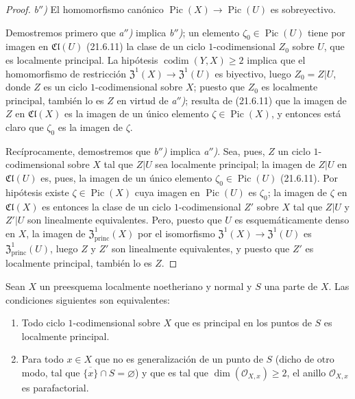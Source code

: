 \begin{proof}
\emph{b$''$)} El homomorfismo canónico
$\operatorname{Pic}(X)\to\operatorname{Pic}(U)$ es sobreyectivo.

Demostremos primero que \emph{a$''$)} implica \emph{b$''$)}; un elemento
$\zeta_0\in\operatorname{Pic}(U)$ tiene por imagen en $\mathfrak{Cl}(U)$ (21.6.11) la
clase de un ciclo $1$-codimensional $Z_0$ sobre $U$, que es localmente principal.
La hipótesis $\operatorname{codim}(Y,X)\geq2$ implica que el homomorfismo de
restricción $\mathfrak{Z}^1(X)\to\mathfrak{Z}^1(U)$ es biyectivo, luego $Z_0=Z|U$, donde $Z$
es un ciclo $1$-codimensional sobre $X$; puesto que $Z_0$ es localmente principal, también lo
es $Z$ en virtud de \emph{a$''$)}; resulta de (21.6.11) que la imagen de $Z$ en
$\mathfrak{Cl}(X)$ es la imagen de un único elemento $\zeta\in\operatorname{Pic}(X)$,
y entonces está claro que $\zeta_0$ es la imagen de $\zeta$.

Recíprocamente, demostremos que \emph{b$''$)} implica \emph{a$''$)}. Sea, pues, $Z$ un ciclo
$1$-codimensional sobre $X$ tal que $Z|U$ sea localmente principal; la imagen de $Z|U$
en $\mathfrak{Cl}(U)$ es, pues, la imagen de un único elemento
$\zeta_0\in\operatorname{Pic}(U)$ (21.6.11). Por hipótesis existe
$\zeta\in\operatorname{Pic}(X)$ cuya imagen en $\operatorname{Pic}(U)$ es
$\zeta_0$; la imagen de $\zeta$ en $\mathfrak{Cl}(X)$ es entonces la clase de un ciclo
$1$-codimensional $Z'$ sobre $X$ tal que $Z|U$ y $Z'|U$ son linealmente
equivalentes. Pero, puesto que $U$ es esquemáticamente denso en $X$, la imagen de
$\mathfrak{Z}^1_{\mathrm{princ}}(X)$ por el isomorfismo
$\mathfrak{Z}^1(X)\to\mathfrak{Z}^1(U)$ es $\mathfrak{Z}^1_{\mathrm{princ}}(U)$, luego $Z$
y $Z'$ son linealmente equivalentes, y puesto que $Z'$ es localmente principal, también lo
es $Z$.
\end{proof}

\begin{corollary}[21.13.15]
\label{IV.21.13.15}
Sean $X$ un preesquema localmente noetheriano y normal y $S$ una parte de $X$. Las
condiciones siguientes son equivalentes:
\begin{enumerate}[label=\emph{\alph*)}]
  \item Todo ciclo $1$-codimensional sobre $X$ que es principal en los puntos de $S$ es
  localmente principal.
  \item Para todo $x\in X$ que no es generalización de un punto de $S$ \textup{(}dicho de otro
  modo, tal que $\overline{\{x\}}\cap S=\varnothing$\textup{)} y que es tal que
  $\dim(\mathcal O_{X,x})\geq2$, el anillo $\mathcal O_{X,x}$ es parafactorial.
\end{enumerate}
\end{corollary}

